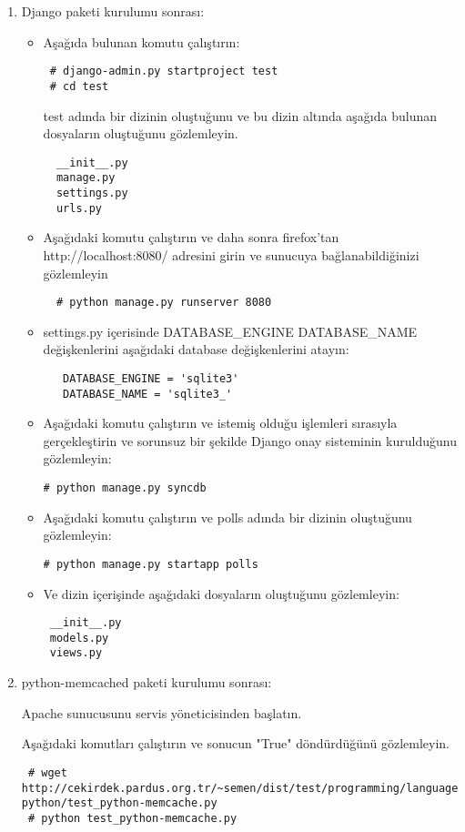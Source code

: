 \documentclass[a4paper,10pt]{article}
\begin{document}
\begin{enumerate}
 \item Django paketi kurulumu sonrası:
\begin{itemize}
 \item Aşağıda bulunan komutu çalıştırın:
 \begin{verbatim}
 # django-admin.py startproject test
 # cd test
 \end{verbatim}
 test adında bir dizinin oluştuğunu ve bu dizin altında aşağıda bulunan dosyaların oluştuğunu gözlemleyin.
  \begin{verbatim}
  __init__.py
  manage.py
  settings.py
  urls.py 
  \end{verbatim}
 \item Aşağıdaki komutu çalıştırın ve daha sonra firefox'tan http://localhost:8080/ adresini girin ve sunucuya bağlanabildiğinizi gözlemleyin
  \begin{verbatim}
  # python manage.py runserver 8080
  \end{verbatim}
 \item settings.py içerisinde DATABASE\_ENGINE DATABASE\_NAME değişkenlerini aşağıdaki database değişkenlerini atayın:
  \begin{verbatim}
   DATABASE_ENGINE = 'sqlite3'
   DATABASE_NAME = 'sqlite3_'   
  \end{verbatim}
\item Aşağıdaki komutu çalıştırın ve istemiş olduğu işlemleri sırasıyla gerçekleştirin ve sorunsuz bir şekilde Django onay sisteminin kurulduğunu gözlemleyin:
\begin{verbatim}
# python manage.py syncdb 
\end{verbatim}
\item Aşağıdaki komutu çalıştırın ve polls adında bir dizinin oluştuğunu gözlemleyin:
\begin{verbatim}
# python manage.py startapp polls 
\end{verbatim}
\item Ve dizin içerişinde aşağıdaki dosyaların oluştuğunu gözlemleyin:
\begin{verbatim}
 __init__.py
 models.py
 views.py
\end{verbatim}

\end{itemize}

\item python-memcached paketi kurulumu sonrası:

Apache sunucusunu servis yöneticisinden başlatın.

Aşağıdaki komutları çalıştırın ve sonucun "True" döndürdüğünü gözlemleyin.
\begin{verbatim}
 # wget http://cekirdek.pardus.org.tr/~semen/dist/test/programming/language/
python/test_python-memcache.py
 # python test_python-memcache.py
\end{verbatim}


\end{enumerate}
\end{document}
